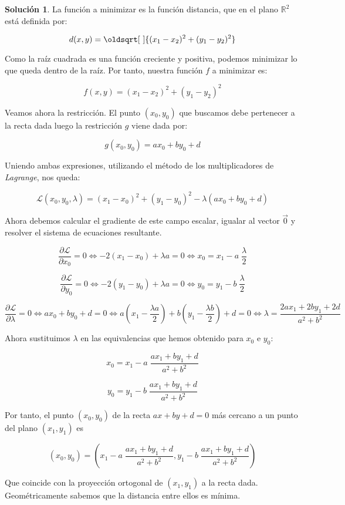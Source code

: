 \documentclass[a4paper, 11pt]{article}
\theoremstyle{definition}
\newtheorem*{solucion}{Solución}
\renewcommand*{\sqrt}[2][\ ]{\oldsqrt[#1]{#2} }
\begin{document}
  \begin{solucion}
    La función a minimizar es la función distancia, que en el plano $\mathbb{R}^2$ está definida por:

    $$ d(x,y) = \sqrt{(x_1 - x_2)^2 + (y_1-y_2)^2} $$

    Como la raíz cuadrada es una función creciente y positiva, podemos minimizar lo que queda dentro de la raíz. Por tanto, nuestra función $f$ a minimizar es:

    $$ f(x,y) = (x_1 - x_2)^2 + (y_1-y_2)^2 $$

    Veamos ahora la restricción. El punto $(x_0,y_0)$ que buscamos debe pertenecer a la recta dada luego la restricción $g$ viene dada por:

    $$ g(x_0,y_0) = ax_0 + by_0 + d $$

    Uniendo ambas expresiones, utilizando el método de los multiplicadores de \emph{Lagrange}, nos queda:

    $$ \mathcal{L}(x_0,y_0, \lambda) = (x_1 - x_0)^2 + (y_1-y_0)^2 - \lambda (ax_0 + by_0 + d) $$

    Ahora debemos calcular el gradiente de este campo escalar, igualar al vector $\vec{0}$ y resolver el sistema de ecuaciones resultante.

    $$ \frac{\partial \mathcal{L}}{\partial x_0} = 0 \Leftrightarrow -2(x_1-x_0) + \lambda a = 0 \Leftrightarrow x_0 = x_1 - a \; \frac{\lambda}{2} $$

    $$ \frac{\partial \mathcal{L}}{\partial y_0} = 0 \Leftrightarrow -2(y_1-y_0) + \lambda a = 0 \Leftrightarrow y_0 = y_1 - b \; \frac{\lambda}{2} $$

    $$ \frac{\partial \mathcal{L}}{\partial \lambda} = 0 \Leftrightarrow ax_0 + by_0 + d = 0 \Leftrightarrow a \left( x_1 - \frac{\lambda a}{2} \right) + b \left( y_1 - \frac{\lambda b}{2} \right) + d = 0 \Leftrightarrow \lambda = \frac{2ax_1 + 2by_1 + 2d}{a^2+b^2} $$

    Ahora sustituimos $\lambda$ en las equivalencias que hemos obtenido para $x_0$ e $y_0$:

    $$ x_0 = x_1 - a \; \frac{ax_1 + by_1 + d}{a^2+b^2} $$

    $$ y_0 = y_1 - b \; \frac{ax_1 + by_1 + d}{a^2+b^2} $$

    Por tanto, el punto $(x_0,y_0)$ de la recta $ax+by+d=0$ más cercano a un punto del plano $(x_1, y_1)$ es

    $$ (x_0, y_0) = (x_1 - a \; \frac{ax_1 + by_1 + d}{a^2+b^2}, y_1 - b \; \frac{ax_1 + by_1 + d}{a^2+b^2}) $$

    Que coincide con la proyección ortogonal de $(x_1,y_1)$ a la recta dada. Geométricamente sabemos que la distancia entre ellos es mínima.


  \end{solucion}
\end{document}
